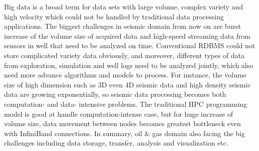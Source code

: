 Big data \cite{WikiBigData} is a broad term for data sets with large volume, complex variety and high velocity which could not be handled by traditional data processing applications. The biggest challenges in seismic domain from now on are burst increase of the volume size of acquired data and high-speed streaming data from sensors in well that need to be analyzed on time. Conventional RDBMS could not store complicated variety data obviously, and moreover, different types of data from exploration, simulation and well logs need to be analyzed jointly, which also need more advance algorithms and models to process. For instance, the volume size of high dimension such as 3D even 4D seismic data and high density seismic data are growing exponentially, so seismic data processing becomes both computation- and data- intensive problems. The traditional HPC programming model is good at handle computation-intense case, but for huge increase of volume size, data movement between nodes becomes greatest bottleneck even with InfiniBand connections. In summary, oil \& gas domain also facing the big challenges including data storage, transfer, analysis and visualization etc.


